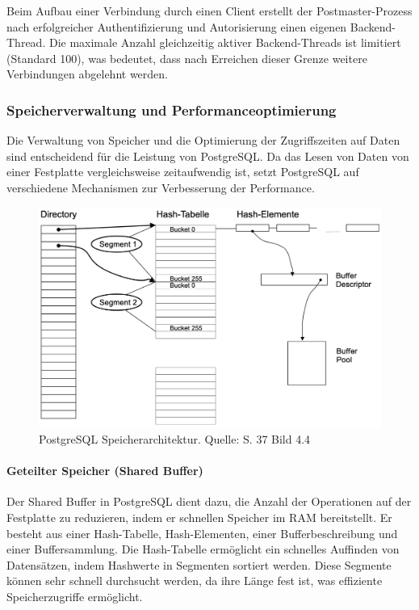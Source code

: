 Beim Aufbau einer Verbindung durch einen Client erstellt der Postmaster-Prozess nach erfolgreicher Authentifizierung und Autorisierung einen eigenen Backend-Thread. Die maximale Anzahl gleichzeitig aktiver Backend-Threads ist limitiert (Standard 100), was bedeutet, dass nach Erreichen dieser Grenze weitere Verbindungen abgelehnt werden.

\subsubsection{Speicherverwaltung und Performanceoptimierung}
Die Verwaltung von Speicher und die Optimierung der Zugriffszeiten auf Daten sind entscheidend für die Leistung von PostgreSQL. Da das Lesen von Daten von einer Festplatte vergleichsweise zeitaufwendig ist, setzt PostgreSQL auf verschiedene Mechanismen zur Verbesserung der Performance.

\begin{figure}[h]
\centering
\includegraphics[width=\textwidth]{img/PostgreSQL Speciheraufbau.png}
\caption{PostgreSQL Speicherarchitektur. Quelle: \cite{Fröhlich2022} S. 37 Bild 4.4}
\label{fig:Speicheraufbau}
\end{figure}

\paragraph{Geteilter Speicher (Shared Buffer)}
Der Shared Buffer in PostgreSQL dient dazu, die Anzahl der Operationen auf der Festplatte zu reduzieren, indem er schnellen Speicher im RAM bereitstellt. Er besteht aus einer Hash-Tabelle, Hash-Elementen, einer Bufferbeschreibung und einer Buffersammlung. Die Hash-Tabelle ermöglicht ein schnelles Auffinden von Datensätzen, indem Hashwerte in Segmenten sortiert werden. Diese Segmente können sehr schnell durchsucht werden, da ihre Länge fest ist, was effiziente Speicherzugriffe ermöglicht.

